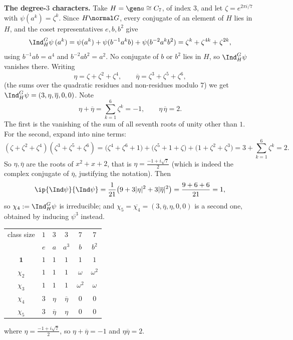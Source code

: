 \textbf{The degree-$3$ characters.} Take $H = \gen a\cong C_7$, of index $3$, and let $\zeta = e^{2\pi i/7}$ with $\psi(a^k) = \zeta^k$. Since $H\normal G$, every conjugate of an element of $H$ lies in $H$, and the coset representatives $e, b, b^2$ give
$$\Ind_H^G\psi\,(a^k) = \psi(a^k)+\psi(b^{-1}a^kb) + \psi(b^{-2}a^kb^2) = \zeta^k+\zeta^{4k}+\zeta^{2k},$$
using $b^{-1}ab = a^4$ and $b^{-2}ab^2 = a^2$. No conjugate of $b$ or $b^2$ lies in $H$, so $\Ind_H^G\psi$ vanishes there. Writing
$$\eta = \zeta+\zeta^2+\zeta^4, \qquad \overline\eta = \zeta^3+\zeta^5+\zeta^6,$$
(the sums over the quadratic residues and non-residues modulo $7$) we get $\Ind_H^G\psi = (3,\eta,\overline\eta,0,0)$. Note
$$\eta+\overline\eta = \sum_{k=1}^6\zeta^k = -1, \qquad \eta\,\overline\eta = 2.$$
The first is the vanishing of the sum of all seventh roots of unity other than $1$. For the second, expand into nine terms:
$$(\zeta+\zeta^2+\zeta^4)(\zeta^3+\zeta^5+\zeta^6) = \big(\zeta^4+\zeta^6+1\big)+\big(\zeta^5+1+\zeta\big)+\big(1+\zeta^2+\zeta^3\big) = 3 + \sum_{k=1}^6\zeta^k = 2.$$
So $\eta,\overline\eta$ are the roots of $x^2+x+2$, that is $\eta = \frac{-1+i\sqrt7}{2}$ (which is indeed the complex conjugate of $\overline\eta$, justifying the notation). Then
$$\ip{\Ind\psi}{\Ind\psi} = \frac1{21}\big(9 + 3|\eta|^2+3|\overline\eta|^2\big) = \frac{9+6+6}{21} = 1,$$
so $\chi_4 := \Ind_H^G\psi$ is irreducible; and $\chi_5 = \overline{\chi_4} = (3,\overline\eta,\eta,0,0)$ is a second one, obtained by inducing $\psi^3$ instead.

\begin{center}
\renewcommand{\arraystretch}{1.35}
\setlength{\tabcolsep}{11pt}
\begin{tabular}{c|ccccc}
\toprule
class size & $1$ & $3$ & $3$ & $7$ & $7$\\
 & $e$ & $a$ & $a^3$ & $b$ & $b^2$\\
\midrule
$\mathbf 1$ & $1$ & $1$ & $1$ & $1$ & $1$\\
$\chi_2$ & $1$ & $1$ & $1$ & $\omega$ & $\omega^2$\\
$\chi_3$ & $1$ & $1$ & $1$ & $\omega^2$ & $\omega$\\
$\chi_4$ & $3$ & $\eta$ & $\overline\eta$ & $0$ & $0$\\
$\chi_5$ & $3$ & $\overline\eta$ & $\eta$ & $0$ & $0$\\
\bottomrule
\end{tabular}
\end{center}
where $\eta = \frac{-1+i\sqrt7}{2}$, so $\eta+\overline\eta = -1$ and $\eta\overline\eta = 2$.

